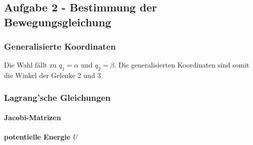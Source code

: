\subsection*{Aufgabe 2 - Bestimmung der Bewegungsgleichung}

\subsubsection*{Generalisierte Koordinaten}
Die Wahl fällt zu $q_1 = \alpha$ und $q_2 = \beta$. Die generalisierten Koordinaten sind somit die Winkel der Gelenke 2 und 3.

\subsubsection*{Lagrang'sche Gleichungen}

\paragraph*{Jacobi-Matrizen}



\paragraph*{potentielle Energie $U$}